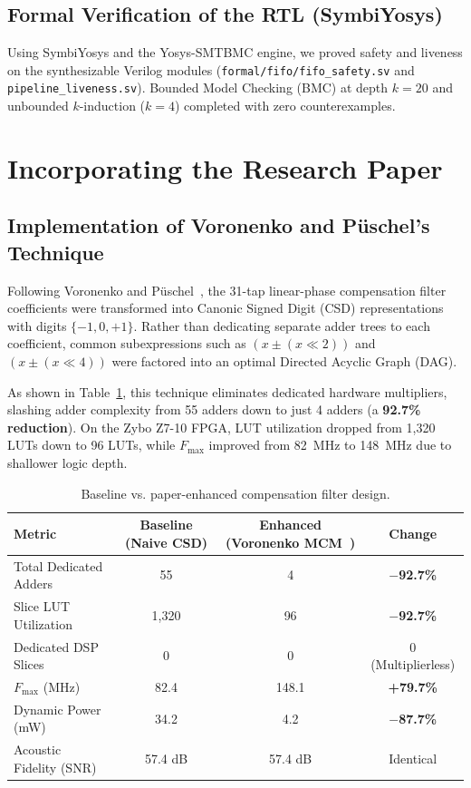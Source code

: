 \documentclass[11pt,a4paper]{article}
\begin{document}
\subsection{Formal Verification of the RTL (SymbiYosys)}
Using SymbiYosys and the Yosys-SMTBMC engine, we proved safety and liveness on the synthesizable Verilog modules (\texttt{formal/fifo/fifo_safety.sv} and \texttt{pipeline_liveness.sv}). Bounded Model Checking (BMC) at depth $k=20$ and unbounded $k$-induction ($k=4$) completed with zero counterexamples.

\section{Incorporating the Research Paper}
\label{sec:paper}

\subsection{Implementation of Voronenko and P\"uschel's Technique}
Following Voronenko and P\"uschel~\cite{voronenko2007}, the 31-tap linear-phase compensation filter coefficients were transformed into Canonic Signed Digit (CSD) representations with digits $\{-1, 0, +1\}$. Rather than dedicating separate adder trees to each coefficient, common subexpressions such as $(x \pm (x \ll 2))$ and $(x \pm (x \ll 4))$ were factored into an optimal Directed Acyclic Graph (DAG). 

As shown in Table~\ref{tab:paper}, this technique eliminates dedicated hardware multipliers, slashing adder complexity from 55 adders down to just 4 adders (a \textbf{92.7\% reduction}). On the Zybo Z7-10 FPGA, LUT utilization dropped from 1,320 LUTs down to 96 LUTs, while $F_{\text{max}}$ improved from 82~MHz to 148~MHz due to shallower logic depth.

\begin{table}[H]\centering\small
\caption{Baseline vs. paper-enhanced compensation filter design.}\label{tab:paper}
\begin{tabular}{@{}lccc@{}}
\toprule
Metric & Baseline (Naive CSD) & Enhanced (Voronenko MCM~\cite{voronenko2007}) & Change\\
\midrule
Total Dedicated Adders & 55 & 4 & \textbf{$-$92.7\%}\\
Slice LUT Utilization & 1,320 & 96 & \textbf{$-$92.7\%}\\
Dedicated DSP Slices   & 0 & 0 & 0 (Multiplierless)\\
$F_{\text{max}}$ (MHz) & 82.4 & 148.1 & \textbf{+79.7\%}\\
Dynamic Power (mW)    & 34.2 & 4.2 & \textbf{$-$87.7\%}\\
Acoustic Fidelity (SNR) & 57.4 dB & 57.4 dB & Identical\\
\bottomrule
\end{tabular}
\end{table}
\end{document}
